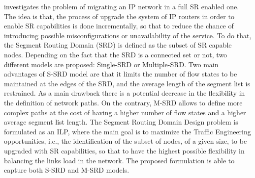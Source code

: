 \cite{incrementaldeploy} investigates the problem of migrating an IP network in a full SR enabled one.
The idea is that, the process of upgrade the system of IP routers in order to enable SR capabilities is done incrementally, so that to reduce the chance of introducing possible misconfigurations or unavailability of the service.
To do that, the Segment Routing Domain (SRD) is defined as the subset of SR capable nodes.
Depending on the fact that the SRD is a connected set or not, two different models are proposed: Single-SRD or Multiple-SRD.
Two main advantages of S-SRD model are that it limits the number of flow states to be maintained at the edges of the SRD, and the average length of the segment list is restrained.
As a main drawback there is a potential decrease in the flexibility in the definition of network paths.
On the contrary, M-SRD allows to define more complex paths at the cost of having a higher number of flow states and a higher average segment list length.
The Segment Routing Domain Design problem is formulated as an ILP, where the main goal is to maximize the Traffic Engineering opportunities, i.e., the identification of the subset of nodes, of a given size, to be upgraded with SR capabilities, so that to have the highest possible flexibility in balancing the links load in the network.
The proposed formulation is able to capture both S-SRD and M-SRD models.

